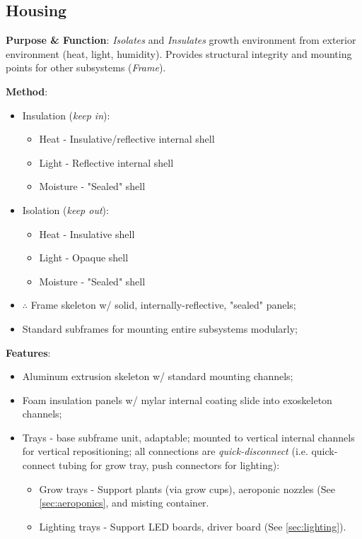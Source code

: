 \documentclass{report}
\begin{document}


\newpage

\subsection{Housing}
\label{sec:housing}

\textbf{Purpose \& Function}: \textit{Isolates} and \textit{Insulates} growth environment from exterior environment (heat, light, humidity). Provides structural integrity and mounting points for other subsystems (\textit{Frame}).

\textbf{Method}:
\begin{itemize}
    \item Insulation (\textit{keep in}):
    \begin{itemize}
        \item Heat - Insulative/reflective internal shell
        \item Light - Reflective internal shell
        \item Moisture - "Sealed" shell
    \end{itemize}
    \item Isolation (\textit{keep out}):
    \begin{itemize}
        \item Heat - Insulative shell
        \item Light - Opaque shell
        \item Moisture - "Sealed" shell
    \end{itemize}
    \item $\therefore$ Frame skeleton w/ solid, internally-reflective, "sealed" panels;
    \item Standard subframes for mounting entire subsystems modularly;
\end{itemize}

\textbf{Features}:
\begin{itemize}
    \item Aluminum extrusion skeleton w/ standard mounting channels;
    \item Foam insulation panels w/ mylar internal coating slide into exoskeleton channels;
    \item Trays - base subframe unit, adaptable; mounted to vertical internal channels for vertical repositioning; all connections are \textit{quick-disconnect} (i.e. quick-connect tubing for grow tray, push connectors for lighting):
    \begin{itemize}
        \item Grow trays - Support plants (via grow cups), aeroponic nozzles (See \ref{sec:aeroponics}, and misting container.
        \item Lighting trays - Support LED boards, driver board (See \ref{sec:lighting}).
    \end{itemize}
\end{itemize}
\end{document}
